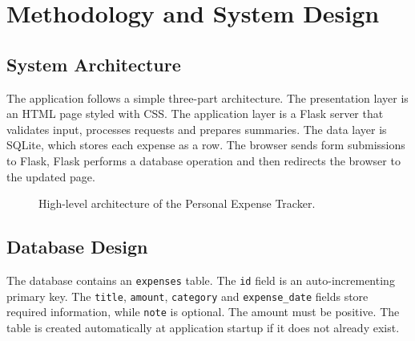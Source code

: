 \documentclass[11pt,a4paper]{report}
\begin{document}
\section{Methodology and System Design}
\subsection{System Architecture}
The application follows a simple three-part architecture. The presentation layer is an HTML page styled with CSS. The application layer is a Flask server that validates input, processes requests and prepares summaries. The data layer is SQLite, which stores each expense as a row. The browser sends form submissions to Flask, Flask performs a database operation and then redirects the browser to the updated page.

\begin{figure}[ht]
\centering
{}
\caption{High-level architecture of the Personal Expense Tracker.}
\label{fig:architecture}
\end{figure}

\subsection{Database Design}
The database contains an \texttt{expenses} table. The \texttt{id} field is an auto-incrementing primary key. The \texttt{title}, \texttt{amount}, \texttt{category} and \texttt{expense\_date} fields store required information, while \texttt{note} is optional. The amount must be positive. The table is created automatically at application startup if it does not already exist.
\end{document}

